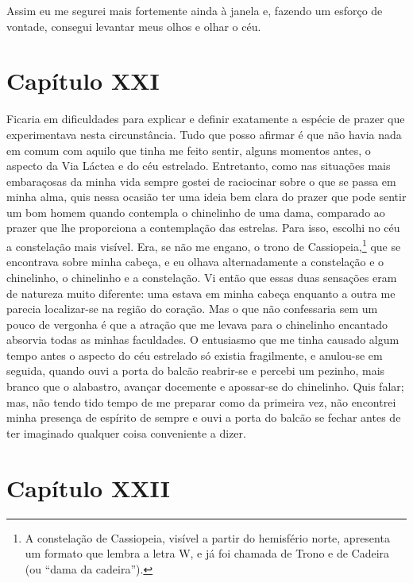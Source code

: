  Assim eu me segurei mais fortemente ainda à janela e, fazendo um
esforço de vontade, consegui levantar meus olhos e olhar o céu. 

\section{Capítulo XXI}

 Ficaria em dificuldades para explicar e definir exatamente a espécie de
prazer que experimentava nesta circunstância. Tudo que posso afirmar é
que não havia nada em comum com aquilo que tinha me feito sentir,
alguns momentos antes, o aspecto da Via Láctea e do céu estrelado.
Entretanto, como nas situações mais embaraçosas da minha vida sempre
gostei de raciocinar sobre o que se passa em minha alma, quis nessa
ocasião ter uma ideia bem clara do prazer que pode sentir um bom homem
quando contempla o chinelinho de uma dama, comparado ao prazer que lhe
proporciona a contemplação das estrelas. Para isso, escolhi no céu a
constelação mais visível. Era, se não me engano, o trono de
Cassiopeia,\footnote{ A constelação de Cassiopeia, visível a partir do
hemisfério norte, apresenta um formato que lembra a letra W, e já foi
chamada de Trono e de Cadeira (ou ``dama da cadeira'').} que se
encontrava sobre minha cabeça, e eu olhava alternadamente a constelação
e o chinelinho, o chinelinho e a constelação. Vi então que essas duas
sensações eram de natureza muito diferente: uma estava em minha cabeça
enquanto a outra me parecia localizar-se na região do coração. Mas o
que não confessaria sem um pouco de vergonha é que a atração que me
levava para o chinelinho encantado absorvia todas as minhas faculdades.
O entusiasmo que me tinha causado algum tempo antes o aspecto do céu
estrelado só existia fragilmente, e anulou-se em seguida, quando ouvi a
porta do balcão reabrir-se e percebi um pezinho, mais branco que o
alabastro, avançar docemente e apossar-se do chinelinho. Quis falar;
mas, não tendo tido tempo de me preparar como da primeira vez, não
encontrei minha presença de espírito de sempre e ouvi a porta do balcão
se fechar antes de ter imaginado qualquer coisa conveniente a dizer.

\section{Capítulo XXII}

